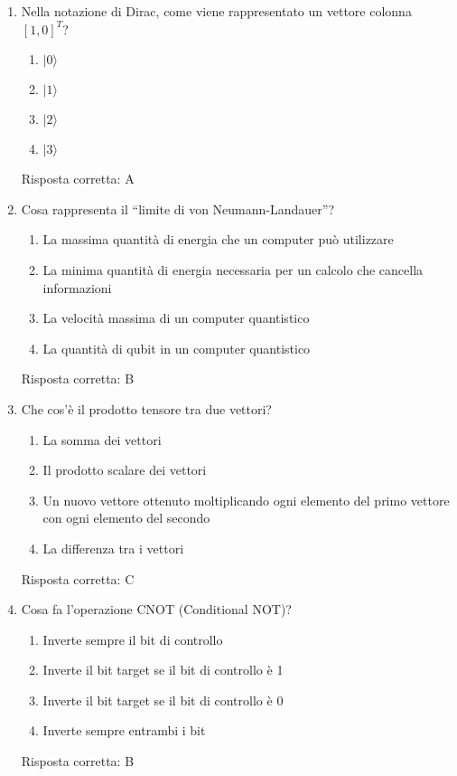 \documentclass{article}
\begin{document}
\begin{enumerate}[label=\textbf{Domanda \arabic*.}]
\item Nella notazione di Dirac, come viene rappresentato un vettore colonna \([1, 0]^T\)?
    \begin{enumerate}[label=\Alph*.]
        \item \(|0\rangle\)
        \item \(|1\rangle\)
        \item \(|2\rangle\)
        \item \(|3\rangle\)
    \end{enumerate}
    Risposta corretta: A

\item Cosa rappresenta il ``limite di von Neumann-Landauer''?
\begin{enumerate}[label=\Alph*.]
    \item La massima quantità di energia che un computer può utilizzare
    \item La minima quantità di energia necessaria per un calcolo che cancella informazioni
    \item La velocità massima di un computer quantistico
    \item La quantità di qubit in un computer quantistico
\end{enumerate}
Risposta corretta: B

\item Che cos'è il prodotto tensore tra due vettori?
\begin{enumerate}[label=\Alph*.]
    \item La somma dei vettori
    \item Il prodotto scalare dei vettori
    \item Un nuovo vettore ottenuto moltiplicando ogni elemento del primo vettore con ogni elemento del secondo
    \item La differenza tra i vettori
\end{enumerate}
Risposta corretta: C

\item Cosa fa l'operazione CNOT (Conditional NOT)?
\begin{enumerate}[label=\Alph*.]
    \item Inverte sempre il bit di controllo
    \item Inverte il bit target se il bit di controllo è 1
    \item Inverte il bit target se il bit di controllo è 0
    \item Inverte sempre entrambi i bit
\end{enumerate}
Risposta corretta: B


\end{enumerate}
\end{document}
